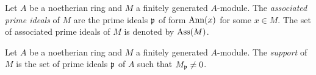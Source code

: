     \begin{definition}
        Let $A$ be a noetherian ring and $M$ a finitely generated $A$-module.
        The \textit{associated prime ideals} of $M$ are the prime ideals ${\mathfrak{p}}$ of form $\operatorname{Ann}(x)$ for some $x \in M$.
        The set of associated prime ideals of $M$ is denoted by $\operatorname{Ass}(M)$.
    \end{definition}


    \begin{definition}
        Let $A$ be a noetherian ring and $M$ a finitely generated $A$-module.
        The \textit{support} of $M$ is the set of prime ideals ${\mathfrak{p}}$ of $A$ such that $M_{\mathfrak{p}} \neq 0$.
    \end{definition}


